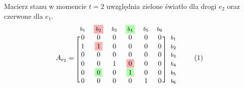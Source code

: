 \documentclass[12pt]{book}
\theoremstyle{plain}
\newcommand\addtag{\refstepcounter{equation}
\renewcommand{\labelenumii}{\theenumii}
\renewcommand{\theenumii}{\theenumi.\arabic{enumii}.}
\tag{\theequation}}
\begin{document}
Macierz stanu w momencie $t=2$ uwzględnia zielone światło dla drogi $e_2$ oraz czerwone dla $e_1$.
\begin{equation*}
A_{e_2}=
\begin{blockarray}{*{6}{c} l}
\begin{block}{*{6}{>{$\footnotesize}c<{$}} l}
$b_1$ & \colorbox{red!30}{$b_2$} & $b_3$ & \colorbox{green!30}{$b_4$} & $b_5$ & $b_6$ \\
\end{block}
\begin{block}{[*{6}{c}]>{$\footnotesize}l<{$}}
0 & 0                     & 0 & 0 & 0 & 0 & $b_1$ \\
1 & \colorbox{red!30}{1}  & 0 & 0 & 0 & 0 & $b_2$ \\
0 & 0                     & 0 & 0 & 0 & 0 &  $b_3$ \\
0 & 0                     & 1 & \colorbox{red!30}{0} & 0 & 0 & $b_4$ \\
0 & \colorbox{green!30}{0}  & 0 & \colorbox{green!30}{1} & 0 & 0 & $b_5$ \\
0 & 0                     & 0 & 0 & 1 & 0 & $b_6$ \\
\end{block}
\end{blockarray} \addtag
\end{equation*}






\def \xzero{
	\begin{bmatrix}
		4 \\ 5 \\ 4 \\ 2 \\ 7 \\ 1
	\end{bmatrix}
}
\end{document}
